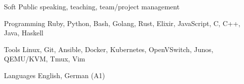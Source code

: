 

\begin{cvskills}

  \cvskill
    {Soft} %
    {Public speaking, teaching, team/project management} %

  \cvskill
    {Programming} %
    {Ruby, Python, Bash, Golang, Rust, Elixir, JavaScript, C, C++, Java, Haskell} %

  \cvskill
    {Tools} %
    {Linux, Git, Ansible, Docker, Kubernetes, OpenVSwitch, Junos, QEMU/KVM, Tmux, Vim} %

  \cvskill
    {Languages} %
    {English, German (A1)} %


\end{cvskills}
